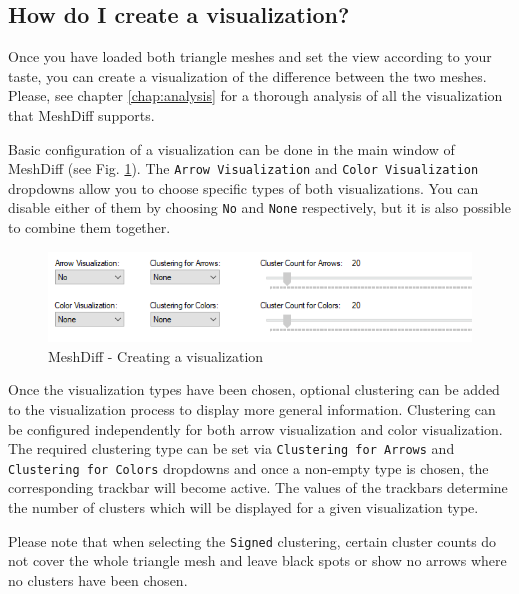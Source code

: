 \subsection{How do I create a visualization?}
\label{attch:user_doc-create_vis}

Once you have loaded both triangle meshes and set the view according to your taste, you can create a visualization of the difference between the two meshes. Please, see chapter \ref{chap:analysis} for a thorough analysis of all the visualization that MeshDiff supports.

Basic configuration of a visualization can be done in the main window of MeshDiff (see Fig. \ref{fig:meshdiff-creating_visualization}). The \verb+Arrow Visualization+ and \verb+Color Visualization+ dropdowns allow you to choose specific types of both visualizations. You can disable either of them by choosing \verb+No+ and \verb+None+ respectively, but it is also possible to combine them together.

\begin{figure}[h]
	\centering
	\includegraphics[width=\textwidth]{./img/meshdiff-vis_settings.PNG}
	\caption[MeshDiff - Creating a visualization]{MeshDiff - Creating a visualization}
	\label{fig:meshdiff-creating_visualization}
\end{figure}

Once the visualization types have been chosen, optional clustering can be added to the visualization process to display more general information. Clustering can be configured independently for both arrow visualization and color visualization. The required clustering type can be set via \verb+Clustering for Arrows+ and \verb+Clustering for Colors+ dropdowns and once a non-empty type is chosen, the corresponding trackbar will become active. The values of the trackbars determine the number of clusters which will be displayed for a given visualization type.

Please note that when selecting the \verb+Signed+ clustering, certain cluster counts do not cover the whole triangle mesh and leave black spots or show no arrows where no clusters have been chosen.

